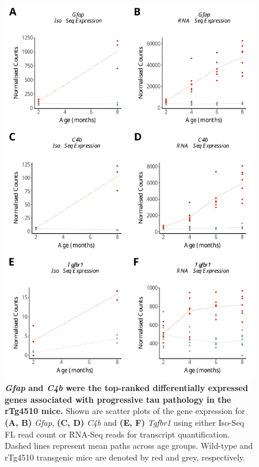 \begin{figure}[h]
	\begin{center}
		\includegraphics[page=1,scale = 0.55]{Figures/WholeDifferentialAnalysis.pdf}
	\end{center}
	\captionsetup{width=0.95\textwidth}
	\caption[Top-ranked differentially expressed genes associated with rTg4510 genotype]%
	{\textbf{\textit{Gfap} and \textit{C4b} were the top-ranked differentially expressed genes associated with progressive tau pathology in the rTg4510 mice.} Shown are scatter plots of the gene expression for \textbf{(A, B)} \textit{Gfap}, \textbf{(C, D)} \textit{C4b} and \textbf{(E, F)} \textit{Tgfbr1} using either Iso-Seq FL read count or RNA-Seq reads for transcript quantification. Dashed lines represent mean paths across age groups. Wild-type and rTg4510 transgenic mice are denoted by red and grey, respectively.}   
	\label{fig:whole_dea}
\end{figure}

